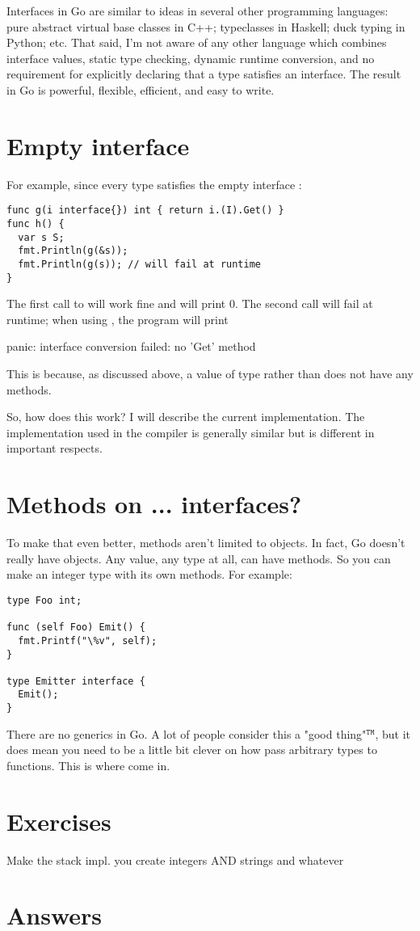 Interfaces in Go are similar to ideas in several other programming languages:
pure abstract virtual base classes in C++; typeclasses in Haskell; duck typing
in Python; etc. That said, I’m not aware of any other language which combines
interface values, static type checking, dynamic runtime conversion, and no
requirement for explicitly declaring that a type satisfies an interface. The
result in Go is powerful, flexible, efficient, and easy to write.

\section{Empty interface}
For example, since every type satisfies the empty interface
:
\begin{lstlisting}
func g(i interface{}) int { return i.(I).Get() }
func h() {
  var s S;
  fmt.Println(g(&s));
  fmt.Println(g(s)); // will fail at runtime
}
\end{lstlisting}
The first call to  will work fine and will print 0. The second call will fail
at runtime; when using , the program will print
\begin{display}
panic: interface conversion failed: no 'Get' method
\end{display}
This is because, as discussed above, a value of type  rather than  
does not have any methods.

So, how does this work? I will describe the current  implementation. The
implementation used in the  compiler is generally similar but is different
in important respects.

\section{Methods on ... interfaces?}

To make that even better, methods aren't limited to objects. In fact, Go
doesn't really have objects. Any value, any type at all, can have methods. So
you can make an integer type with its own methods. For example:

\begin{lstlisting}
type Foo int;

func (self Foo) Emit() {
  fmt.Printf("\%v", self);
}

type Emitter interface {
  Emit();
}
\end{lstlisting}

There are no generics in Go. A lot of people consider this a "good
thing"$^\mathtt{TM}$, but it does mean you need to be a little bit 
clever on how pass arbitrary types to functions. This is 
where  come in.

\section{Exercises}


Make the stack impl. you create integers AND strings and whatever

\cleardoublepage
\section{Answers}
\shipoutAnswer
